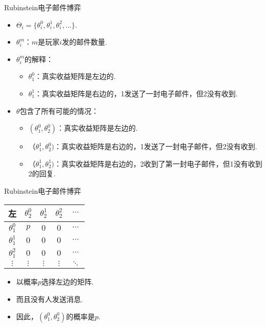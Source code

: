 \begin{frame}{Rubinstein电子邮件博弈}
\begin{itemize}
\item $\Theta_i = \{\theta_i^0, \theta_i^1, \theta_i^2, \dots\}$.
\item $\theta_i^m$：$m$是玩家$i$发的邮件数量.
\item $\theta_i^m$的解释：
\begin{itemize}
    \item $\theta_1^0$：真实收益矩阵是左边的. 
    \item $\theta_1^1$：真实收益矩阵是右边的，1发送了一封电子邮件，但2没有收到. 
\end{itemize}
\item $\theta$包含了所有可能的情况：
\begin{itemize}
    \item $(\theta_1^0, \theta_2^0)$：真实收益矩阵是左边的. 
\item （$\theta_1^1, \theta_2^0)$：真实收益矩阵是右边的，1发送了一封电子邮件，但2没有收到. 
\item （$\theta_1^1, \theta_2^1)$：真实收益矩阵是右边的，2收到了第一封电子邮件，但1没有收到2的回复. 
\end{itemize}
\end{itemize}
\end{frame}

\begin{frame}{Rubinstein电子邮件博弈}
\begin{table}[]
    \centering
\begin{tabular}{c|cccc}
左& $\theta_2^0$ & $\theta_2^1$ & $\theta_2^2$ & $\cdots$ \\
\hline
$\theta_1^0$ & $p$ & $0$ & $0$ & $\cdots$ \\
$\theta_1^1$ & $0$ & $0$ & $0$ & $\cdots$ \\
$\theta_1^2$ & $0$ & $0$ & $0$ & $\cdots$ \\
$\vdots$ & $\vdots$ & $\vdots$ & $\vdots$ & $\ddots$
\end{tabular}
\end{table}
\begin{itemize}
\item 以概率$p$选择左边的矩阵.
\item 而且没有人发送消息.
\item 因此，$(\theta_1^0,\theta_2^0)$的概率是$p$.
\end{itemize}
\end{frame}

